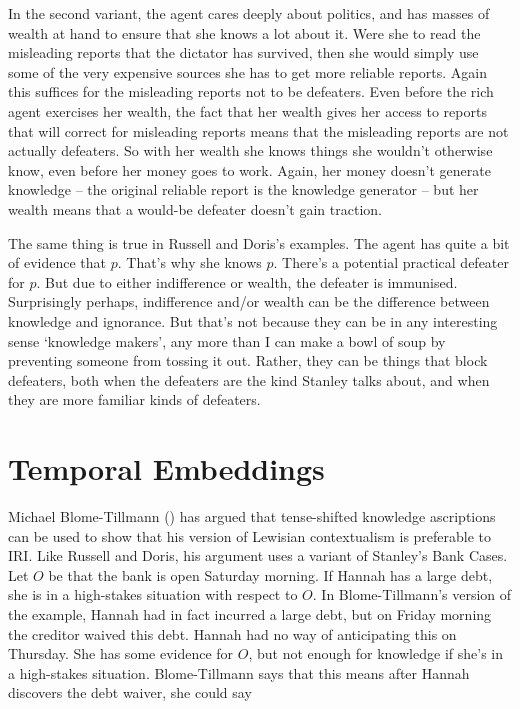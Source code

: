 \documentclass[
  11pt,
  letterpaper,
  DIV=11,
  numbers=noendperiod,
  oneside]{scrartcl}
\begin{document}
In the second variant, the agent cares deeply about politics, and has
masses of wealth at hand to ensure that she knows a lot about it. Were
she to read the misleading reports that the dictator has survived, then
she would simply use some of the very expensive sources she has to get
more reliable reports. Again this suffices for the misleading reports
not to be defeaters. Even before the rich agent exercises her wealth,
the fact that her wealth gives her access to reports that will correct
for misleading reports means that the misleading reports are not
actually defeaters. So with her wealth she knows things she wouldn't
otherwise know, even before her money goes to work. Again, her money
doesn't generate knowledge -- the original reliable report is the
knowledge generator -- but her wealth means that a would-be defeater
doesn't gain traction.

The same thing is true in Russell and Doris's examples. The agent has
quite a bit of evidence that \(p\). That's why she knows \(p\). There's
a potential practical defeater for \(p\). But due to either indifference
or wealth, the defeater is immunised. Surprisingly perhaps, indifference
and/or wealth can be the difference between knowledge and ignorance. But
that's not because they can be in any interesting sense `knowledge
makers', any more than I can make a bowl of soup by preventing someone
from tossing it out. Rather, they can be things that block defeaters,
both when the defeaters are the kind Stanley talks about, and when they
are more familiar kinds of defeaters.

\section{Temporal Embeddings}\label{sect:time}

Michael Blome-Tillmann () has argued that
tense-shifted knowledge ascriptions can be used to show that his version
of Lewisian contextualism is preferable to IRI. Like Russell and Doris,
his argument uses a variant of Stanley's Bank Cases. Let
\(O\) be that the bank is open Saturday morning. If Hannah has a large
debt, she is in a high-stakes situation with respect to \(O\). In
Blome-Tillmann's version of the example, Hannah had in fact incurred a
large debt, but on Friday morning the creditor waived this debt. Hannah
had no way of anticipating this on Thursday. She has some evidence for
\(O\), but not enough for knowledge if she's in a high-stakes situation.
Blome-Tillmann says that this means after Hannah discovers the debt
waiver, she could say
\end{document}

